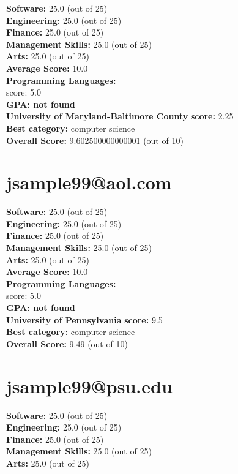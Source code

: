 \documentclass{article}
\begin{document}
\textbf{Software:} 25.0 (out of 25)\\
    \textbf{Engineering: } 25.0 (out of 25)\\
    \textbf{Finance:} 25.0 (out of 25)\\
    \textbf{Management Skills:} 25.0 (out of 25)\\
    \textbf{Arts:} 25.0 (out of 25)\\
\textbf{Average Score: } 10.0\\
\textbf{Programming Languages:} \\
score: 5.0\\
\textbf{GPA: not found}\\
\textbf{University of Maryland-Baltimore County} \textbf{score:} 2.25\\
\textbf{Best category: } computer science\\
    \textbf{Overall Score: }9.602500000000001 (out of 10)\section{jsample99@aol.com}
\textbf{Software:} 25.0 (out of 25)\\
    \textbf{Engineering: } 25.0 (out of 25)\\
    \textbf{Finance:} 25.0 (out of 25)\\
    \textbf{Management Skills:} 25.0 (out of 25)\\
    \textbf{Arts:} 25.0 (out of 25)\\
\textbf{Average Score: } 10.0\\
\textbf{Programming Languages:} \\
score: 5.0\\
\textbf{GPA: not found}\\
\textbf{University of Pennsylvania} \textbf{score:} 9.5\\
\textbf{Best category: } computer science\\
    \textbf{Overall Score: }9.49 (out of 10)\section{jsample99@psu.edu}
\textbf{Software:} 25.0 (out of 25)\\
    \textbf{Engineering: } 25.0 (out of 25)\\
    \textbf{Finance:} 25.0 (out of 25)\\
    \textbf{Management Skills:} 25.0 (out of 25)\\
    \textbf{Arts:} 25.0 (out of 25)\\
\end{document}

